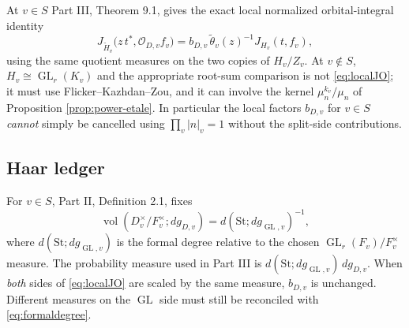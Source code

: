 \documentclass[11pt]{article}
\newcommand{\GL}{\operatorname{GL}}
\newcommand{\vol}{\operatorname{vol}}
\newcommand{\tH}{\widetilde H}
\theoremstyle{plain}
\theoremstyle{definition}
\begin{document}
At $v\in S$ Part III, Theorem 9.1, gives the exact local
normalized orbital-integral identity
\begin{equation}\label{eq:localJO}
 J_{\tH_v}\bigl(z\,t^*,\mathcal O_{D,v}f_v\bigr)
 =b_{D,v}\,\widetilde\theta_v(z)^{-1}
 J_{H_v}(t,f_v),
\end{equation}
using the same quotient measures on the two copies of $H_v/Z_v$.
At $v\notin S$, $H_v\cong\GL_r(K_v)$ and the appropriate
root-sum comparison is not \eqref{eq:localJO}; it must use
Flicker--Kazhdan--Zou, and it can involve the kernel
$\mu_n^{k_v}/\mu_n$ of Proposition \ref{prop:power-etale}.
In particular the local factors $b_{D,v}$ for $v\in S$
\emph{cannot} simply be cancelled using
$\prod_v|n|_v=1$ without the split-side contributions.

\subsection{Haar ledger}\label{subsec:ledger}
For $v\in S$, Part II, Definition 2.1, fixes
\begin{equation}\label{eq:formaldegree}
 \vol(D_v^\times/F_v^\times;dg_{D,v})
 =d(\mathrm{St};dg_{\GL,v})^{-1},
\end{equation}
where $d(\mathrm{St};dg_{\GL,v})$ is the formal degree
relative to the chosen $\GL_r(F_v)/F_v^\times$ measure.
The probability measure used in Part III is
$d(\mathrm{St};dg_{\GL,v})\,dg_{D,v}$.
When \emph{both} sides of \eqref{eq:localJO} are scaled by the
same measure, $b_{D,v}$ is unchanged.  Different measures on the
$\GL$ side must still be reconciled with \eqref{eq:formaldegree}.
\end{document}
